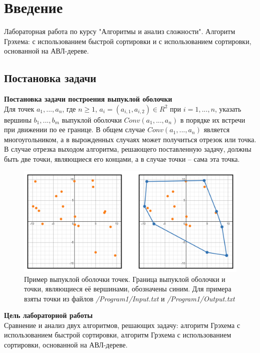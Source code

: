 \section{Введение}
Лабораторная работа по курсу "Алгоритмы и анализ сложности". Алгоритм Грэхема: с использованием быстрой сортировки и с использованием сортировки, основанной на АВЛ-дереве.

\subsection{Постановка задачи}

\noindent \textbf{Постановка задачи построения выпуклой оболочки}\\
\indent Для точек $a_1, ..., a_n$, где $n\geq1$, $a_i=(a_{i,1},a_{i,2})\in R^2$ при $i=1,...,n$, указать вершины $b_1,...,b_m$ выпуклой оболочки $Conv(a_1,...,a_n)$ в порядке их встречи при движении по ее границе. В общем случае $Conv(a_1,...,a_n)$ является многоугольником, а в вырожденных случаях может получиться отрезок или точка. В случае отрезка выходом алгоритма, решающего поставленную задачу, должны быть две точки, являющиеся его концами, а в случае точки -- сама эта точка.

\begin{figure}[h]
	\centering
	\includegraphics[width=\textwidth]{Images/convex_hull_example.png}
	\caption{Пример выпуклой оболочки точек. Граница выпуклой оболочки и точки, являющиеся её вершинами, обозначены синим. Для примера взяты точки из файлов \textsl{/Program1/Input.txt} и \textsl{/Program1/Output.txt}}
	\label{fig:convex_hull_example}
\end{figure}

\noindent \textbf{Цель лабораторной работы}\\
\indent Сравнение и анализ двух алгоритмов, решающих задачу: алгоритм Грэхема с использованием быстрой сортировки, алгоритм Грэхема с использованием сортировки, основанной на АВЛ-дереве.

